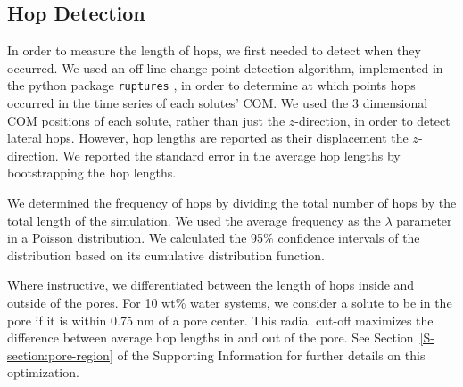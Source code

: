 \documentclass[journal=jpcbfk,manuscript=article]{achemso}
\begin{document}

  \subsection{Hop Detection}\label{method:hop_detection}
  
  In order to measure the length of hops, we first needed to detect
  when they occurred. We used an off-line change point detection 
  algorithm, implemented in the python package \texttt{ruptures}
  \cite{truong_ruptures:_2018}, in order to determine at which 
  points hops occurred in the time series of each solutes' COM. We
  used the 3 dimensional COM positions of each solute, rather than
  just the $z$-direction, in order to detect lateral hops. However,
  hop lengths are reported as their displacement the $z$-direction.
  We reported the standard error in the average hop lengths by 
  bootstrapping the hop lengths.
  
  We determined the frequency of hops by dividing the total number of 
  hops by the total length of the simulation. We used the average
  frequency as the $\lambda$ parameter in a Poisson distribution. We
  calculated the 95\% confidence intervals of the distribution based
  on its cumulative distribution function. 
 
  
  Where instructive, we differentiated between the length of hops inside
  and outside of the pores. For 10 wt\% water systems, we consider a solute
  to be in the pore if it is within 0.75 nm of a pore center. This radial
  cut-off maximizes the difference between average hop lengths in and out
  of the pore. See Section~\ref{S-section:pore-region} of the Supporting
  Information for further details on this optimization.
  
\end{document}
